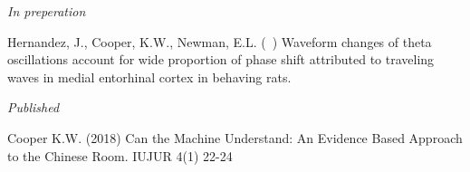 \begin{cvpubentries}


\iftrue
  \cvpubentry
    {\textit{In preperation}} %
    { } %
    { } %
    { } %
    {
      \begin{cvpubitems} %
        \item {Hernandez,  J.,  Cooper,  K.W.,  Newman,  E.L.  (~)  Waveform  changes  of  theta  oscillations  account  for  wide  proportion  of  phase  shift  attributed  to  traveling  waves  in  medial  entorhinal  cortex  in  behaving  rats. }
      \end{cvpubitems}
    }
\fi

\iffalse
  \cvpubentry
    {\textit{In press}} %
    {} %
    {} %
    {} %
    {
      \begin{cvpubitems} %
        \item {pub}
      \end{cvpubitems}
    }
\fi

  \cvpubentry
    {\textit{Published}} %
    {} %
    {} %
    {} %
    {
      \begin{cvpubitems} %
        \item {Cooper K.W. (2018) Can the Machine Understand: An Evidence Based Approach to the Chinese Room. IUJUR 4(1) 22-24}
      \end{cvpubitems}
    }
\iffalse %
\fi


\end{cvpubentries}
